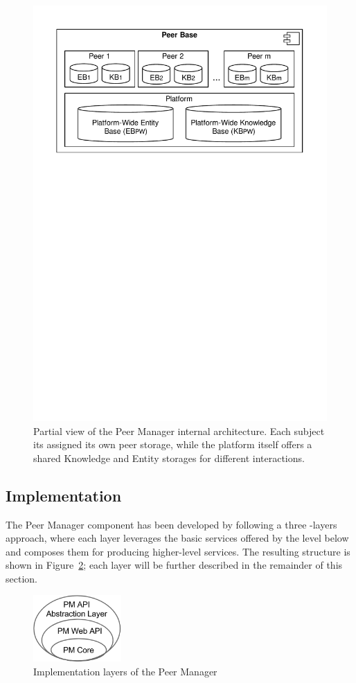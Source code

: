 \begin{figure}[t]
	\centering
	\includegraphics[width=0.65\linewidth]{figures/peerBase-diagram.pdf}
	\caption{Partial view of the Peer Manager internal architecture. Each subject its assigned its own peer storage, while the platform itself offers a shared Knowledge and Entity storages for different interactions.}
	\label{fig:peerManagerPlatform}
\end{figure}

\subsection{Implementation}

The Peer Manager component has been developed by following a three -layers approach, where each layer leverages the basic services offered by the level below and composes them for producing higher-level services. The resulting structure is shown in Figure~\ref{fig:pm-component-layers}; each layer will be further described in the remainder of this section. 

\begin{figure}[htbp]
\centering
\includegraphics[width=0.3\textwidth]{figures/pm-component-layers.png}
\caption{Implementation layers of the Peer Manager}
\label{fig:pm-component-layers}
\end{figure}

